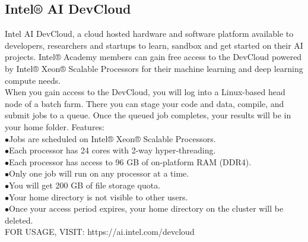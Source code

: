 \subsection{Intel® AI DevCloud}
Intel AI DevCloud, a cloud hosted hardware and software platform available to developers, researchers and startups to learn, sandbox and get started on their AI  projects. Intel® Academy members can gain free access to the DevCloud powered by Intel® Xeon® Scalable Processors for their machine learning and deep learning compute needs. \\
When you gain access to the DevCloud, you will log into a Linux-based head node of a batch farm. There you can stage your code and data, compile, and submit jobs to a queue. Once the queued job completes, your results will be in your home folder. Features:\\
\indent$\bullet$Jobs are scheduled on Intel® Xeon® Scalable Processors.\\
\indent$\bullet$Each processor has 24 cores with 2-way hyper-threading.\\
\indent$\bullet$Each processor has access to 96 GB of on-platform RAM (DDR4).\\
\indent$\bullet$Only one job will run on any processor at a time.\\
\indent$\bullet$You will get 200 GB of file storage quota.\\
\indent$\bullet$Your home directory is not visible to other users.\\
\indent$\bullet$Once your access period expires, your home directory on the cluster will be deleted.\\
FOR USAGE, VISIT: https://ai.intel.com/devcloud

